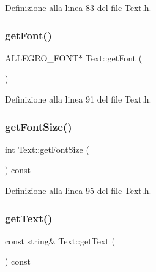 Definizione alla linea 83 del file Text.\+h.

\mbox{\label{class_text_a8fdfafd6574a3ec78667f5a7af64e225}} 
\subsubsection{\texorpdfstring{get\+Font()}{getFont()}}
{\footnotesize\ttfamily A\+L\+L\+E\+G\+R\+O\+\_\+\+F\+O\+NT$\ast$ Text\+::get\+Font (\begin{DoxyParamCaption}{ }\end{DoxyParamCaption})\hspace{0.3cm}{\ttfamily [inline]}}



Definizione alla linea 91 del file Text.\+h.

\mbox{\label{class_text_af6db01e16738de0391ad928c54334f0e}} 
\subsubsection{\texorpdfstring{get\+Font\+Size()}{getFontSize()}}
{\footnotesize\ttfamily int Text\+::get\+Font\+Size (\begin{DoxyParamCaption}{ }\end{DoxyParamCaption}) const\hspace{0.3cm}{\ttfamily [inline]}}



Definizione alla linea 95 del file Text.\+h.

\mbox{\label{class_text_ad955f2a73bfd93cbfaeb21d43454a6c5}} 
\subsubsection{\texorpdfstring{get\+Text()}{getText()}}
{\footnotesize\ttfamily const string\& Text\+::get\+Text (\begin{DoxyParamCaption}{ }\end{DoxyParamCaption}) const\hspace{0.3cm}{\ttfamily [inline]}}



